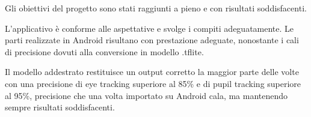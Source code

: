 Gli obiettivi del progetto sono stati raggiunti a pieno e con risultati soddisfacenti.

L’applicativo è conforme alle aspettative e svolge i compiti adeguatamente. Le parti realizzate in Android risultano con prestazione adeguate, nonostante i cali di precisione dovuti alla conversione in modello .tflite.

Il modello addestrato restituisce un output corretto la maggior parte delle volte con una precisione di eye tracking superiore al 85\% e di pupil tracking superiore al 95\%, precisione che una volta importato su Android cala, ma mantenendo sempre risultati soddisfacenti.